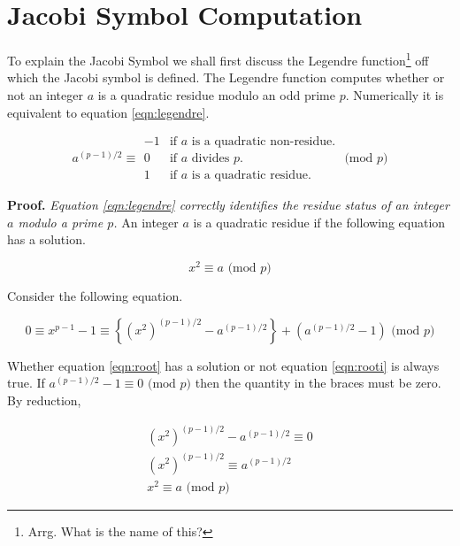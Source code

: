 \documentclass[b5paper]{book}
\begin{document}
\section{Jacobi Symbol Computation}
To explain the Jacobi Symbol we shall first discuss the Legendre function\footnote{Arrg.  What is the name of this?} off which the Jacobi symbol is 
defined.  The Legendre function computes whether or not an integer $a$ is a quadratic residue modulo an odd prime $p$.  Numerically it is
equivalent to equation \ref{eqn:legendre}.

\begin{equation}
a^{(p-1)/2} \equiv \begin{array}{rl}
                              -1 &  \mbox{if }a\mbox{ is a quadratic non-residue.} \\
                              0  &  \mbox{if }a\mbox{ divides }p\mbox{.} \\
                              1  &  \mbox{if }a\mbox{ is a quadratic residue}. 
                              \end{array} \mbox{ (mod }p\mbox{)}
\label{eqn:legendre}                              
\end{equation}

\textbf{Proof.} \textit{Equation \ref{eqn:legendre} correctly identifies the residue status of an integer $a$ modulo a prime $p$.}
An integer $a$ is a quadratic residue if the following equation has a solution.

\begin{equation}
x^2 \equiv a \mbox{ (mod }p\mbox{)}
\label{eqn:root}
\end{equation}

Consider the following equation.

\begin{equation}
0 \equiv x^{p-1} - 1 \equiv \left \lbrace \left (x^2 \right )^{(p-1)/2} - a^{(p-1)/2} \right \rbrace + \left ( a^{(p-1)/2} - 1 \right ) \mbox{ (mod }p\mbox{)}
\label{eqn:rooti}
\end{equation}

Whether equation \ref{eqn:root} has a solution or not equation \ref{eqn:rooti} is always true.  If $a^{(p-1)/2} - 1 \equiv 0 \mbox{ (mod }p\mbox{)}$
then the quantity in the braces must be zero.  By reduction,

\begin{eqnarray}
\left (x^2 \right )^{(p-1)/2} - a^{(p-1)/2} \equiv 0  \nonumber \\
\left (x^2 \right )^{(p-1)/2} \equiv a^{(p-1)/2} \nonumber \\
x^2 \equiv a \mbox{ (mod }p\mbox{)} 
\end{eqnarray}
\end{document}
